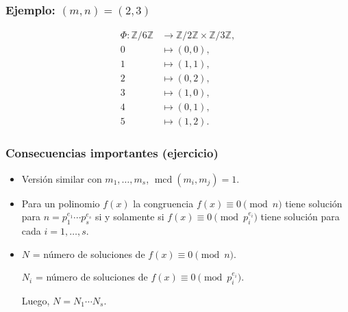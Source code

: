\documentclass[handout]{beamer}
\newcommand{\ZZ}{\mathbb{Z}}
\DeclareMathOperator{\mcd}{mcd}
\begin{document}

\begin{frame}
  \frametitle{Ejemplo: $(m,n) = (2,3)$}

  \begin{align*}
    \Phi\colon \ZZ/6\ZZ & \to \ZZ/2\ZZ \times \ZZ/3\ZZ, \\
    0 & \mapsto (0,0), \\
    1 & \mapsto (1,1), \\
    2 & \mapsto (0,2), \\
    3 & \mapsto (1,0), \\
    4 & \mapsto (0,1), \\
    5 & \mapsto (1,2).
  \end{align*}
\end{frame}


\begin{frame}
  \frametitle{Consecuencias importantes (ejercicio)}

  \begin{itemize}
  \item<2-> Versión similar con $m_1, \ldots, m_s$, $\mcd (m_i,m_j) = 1$.

  \item<3-> Para un polinomio $f (x)$ la congruencia $f (x) \equiv 0 \pmod{n}$
    tiene solución para $n = p_1^{e_1} \cdots p_s^{e_s}$ si y solamente si
    $f (x) \equiv 0 \pmod{p_i^{e_i}}$ tiene solución para cada $i = 1,\ldots,s$.

  \item<4-> $N$ = número de soluciones de $f (x) \equiv 0 \pmod{n}$.

    $N_i$ = número de soluciones de $f (x) \equiv 0 \pmod{p_i^{e_i}}$.

    Luego, $N = N_1 \cdots N_s$.
  \end{itemize}
\end{frame}

\end{document}
